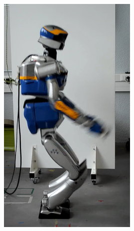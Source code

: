 \begin{figure}
\begin{subfigure}{0.19\columnwidth}
    \includegraphics[width = \columnwidth]
                    {src/chap3-optimal-motion-planning/figure/self-collision-2.png}
    \label{self-collision-2}
  \end{subfigure}
  \begin{subfigure}{0.19\columnwidth}
    \centering

\end{subfigure}
\end{figure}
